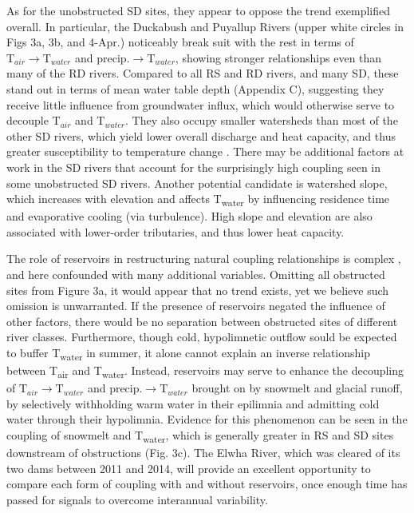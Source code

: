 \documentclass[notitlepage]{article}
\begin{document}
As for the unobstructed SD sites, they appear to oppose the trend exemplified overall. In particular, the Duckabush and Puyallup Rivers (upper white circles in Figs 3a, 3b, and 4-Apr.) noticeably break suit with the rest in terms of $\textrm{T}_{air}\rightarrow \textrm{T}_{water}$ and $\textrm{precip.}\rightarrow \textrm{T}_{water}$, showing stronger relationships even than many of the RD rivers. Compared to all RS and RD rivers, and many SD, these stand out in terms of mean water table depth (Appendix C), suggesting they receive little influence from groundwater influx, which would otherwise serve to decouple $\textrm{T}_{air}$ and $\textrm{T}_{water}$. They also occupy smaller watersheds than most of the other SD rivers, which yield lower overall discharge and heat capacity, and thus greater susceptibility to temperature change \citep{caissie2006thermal}. There may be additional factors at work in the SD rivers that account for the surprisingly high coupling seen in some unobstructed SD rivers. Another potential candidate is watershed slope, which increases with elevation and affects T\textsubscript{water} by influencing residence time and evaporative cooling (via turbulence). High slope and elevation are also associated with lower-order tributaries, and thus lower heat capacity. 

The role of reservoirs in restructuring natural coupling relationships is complex \citep{damsComplex,WarmingPostDam}, and here confounded with many additional variables. Omitting all obstructed sites from Figure 3a, it would appear that no trend exists, yet we believe such omission is unwarranted. If the presence of reservoirs negated the influence of other factors, there would be no separation between obstructed sites of different river classes. Furthermore, though cold, hypolimnetic outflow sould be expected to buffer T\textsubscript{water} in summer, it alone cannot explain an inverse relationship between T\textsubscript{air} and T\textsubscript{water}. Instead, reservoirs may serve to enhance the decoupling of $\textrm{T}_{air}\rightarrow \textrm{T}_{water}$ and $\textrm{precip.}\rightarrow \textrm{T}_{water}$ brought on by snowmelt and glacial runoff, by selectively withholding warm water in their epilimnia and admitting cold water through their hypolimnia. Evidence for this phenomenon can be seen in the coupling of snowmelt and T\textsubscript{water}, which is generally greater in RS and SD sites downstream of obstructions (Fig. 3c). The Elwha River, which was cleared of its two dams between 2011 and 2014, will provide an excellent opportunity to compare each form of coupling with and without reservoirs, once enough time has passed for signals to overcome interannual variability.
\end{document}
